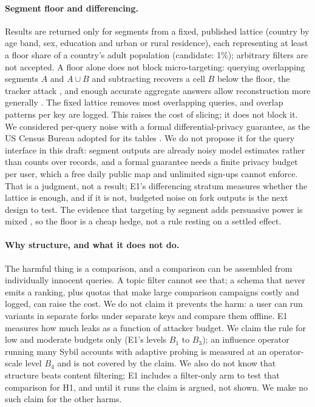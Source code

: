 \documentclass[11pt]{article}
\begin{document}
\paragraph{Segment floor and differencing.} Results are returned only for segments from a fixed, published lattice (country by age band, sex, education and urban or rural residence), each representing at least a floor share of a country's adult population (candidate: 1\%); arbitrary filters are not accepted. A floor alone does not block micro-targeting: querying overlapping segments $A$ and $A\cup B$ and subtracting recovers a cell $B$ below the floor, the tracker attack \citep{denning1979tracker}, and enough accurate aggregate answers allow reconstruction more generally \citep{dinur2003revealing}. The fixed lattice removes most overlapping queries, and overlap patterns per key are logged. This raises the cost of slicing; it does not block it. We considered per-query noise with a formal differential-privacy guarantee, as the US Census Bureau adopted for its tables \citep{abowd2018census,garfinkel2019reconstruction}. We do not propose it for the query interface in this draft: segment outputs are already noisy model estimates rather than counts over records, and a formal guarantee needs a finite privacy budget per user, which a free daily public map and unlimited sign-ups cannot enforce. That is a judgment, not a result; E1's differencing stratum measures whether the lattice is enough, and if it is not, budgeted noise on fork outputs is the next design to test. The evidence that targeting by segment adds persuasive power is mixed \citep{hackenburg2024microtargeting,simchon2024microtargeting,matz2024personalized}, so the floor is a cheap hedge, not a rule resting on a settled effect.

\paragraph{Why structure, and what it does not do.} The harmful thing is a comparison, and a comparison can be assembled from individually innocent queries. A topic filter cannot see that; a schema that never emits a ranking, plus quotas that make large comparison campaigns costly and logged, can raise the cost. We do not claim it prevents the harm: a user can run variants in separate forks under separate keys and compare them offline. E1 measures how much leaks as a function of attacker budget. We claim the rule for low and moderate budgets only (E1's levels $B_1$ to $B_3$); an influence operator running many Sybil accounts with adaptive probing is measured at an operator-scale level $B_4$ and is not covered by the claim. We also do not know that structure beats content filtering; E1 includes a filter-only arm to test that comparison for H1, and until it runs the claim is argued, not shown. We make no such claim for the other harms.
\end{document}
